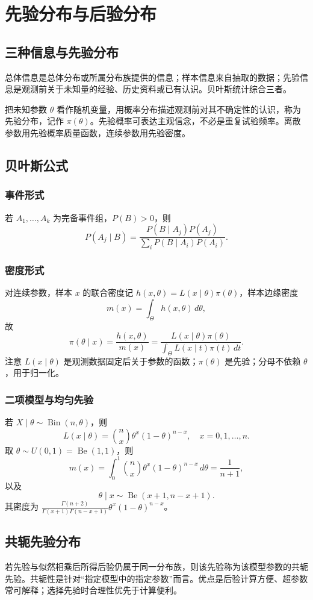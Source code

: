 \chapter{先验分布与后验分布}
\section{三种信息与先验分布}
总体信息是总体分布或所属分布族提供的信息；样本信息来自抽取的数据；先验信息是观测前关于未知量的经验、历史资料或已有认识。贝叶斯统计综合三者。

把未知参数 $\theta$ 看作随机变量，用概率分布描述观测前对其不确定性的认识，称为先验分布，记作 $\pi(\theta)$。先验概率可表达主观信念，不必是重复试验频率。离散参数用先验概率质量函数，连续参数用先验密度。

\section{贝叶斯公式}
\subsection{事件形式}
若 $A_1,\dots,A_k$ 为完备事件组，$P(B)>0$，则
\[
P(A_j\mid B)=\frac{P(B\mid A_j)P(A_j)}{\sum_iP(B\mid A_i)P(A_i)}.
\]
\subsection{密度形式}
对连续参数，样本 $x$ 的联合密度记 $h(x,\theta)=L(x\mid\theta)\pi(\theta)$，样本边缘密度
\[
m(x)=\int_\Theta h(x,\theta)\,d\theta,
\]
故
\[
\pi(\theta\mid x)=\frac{h(x,\theta)}{m(x)}
=\frac{L(x\mid\theta)\pi(\theta)}{\int_\Theta L(x\mid t)\pi(t)\,dt}.
\]
注意 $L(x\mid\theta)$ 是观测数据固定后关于参数的函数；$\pi(\theta)$ 是先验；分母不依赖 $\theta$，用于归一化。

\subsection{二项模型与均匀先验}
若 $X\mid\theta\sim\operatorname{Bin}(n,\theta)$，则
\[
L(x\mid\theta)=\binom{n}{x}\theta^x(1-\theta)^{n-x},\quad x=0,1,\ldots,n.
\]
取 $\theta\sim U(0,1)=\operatorname{Be}(1,1)$，则
\[
m(x)=\int_0^1\binom{n}{x}\theta^x(1-\theta)^{n-x}\,d\theta=\frac1{n+1},
\]
以及
\[
\theta\mid x\sim\operatorname{Be}(x+1,n-x+1).
\]
其密度为 $\frac{\Gamma(n+2)}{\Gamma(x+1)\Gamma(n-x+1)}\theta^x(1-\theta)^{n-x}$。

\section{共轭先验分布}
若先验与似然相乘后所得后验仍属于同一分布族，则该先验称为该模型参数的共轭先验。共轭性是针对“指定模型中的指定参数”而言。优点是后验计算方便、超参数常可解释；选择先验时合理性优先于计算便利。

